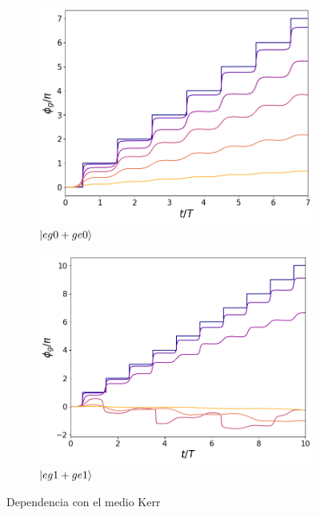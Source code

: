 \begin{figure}[h]
    \centering
    \begin{subfigure}{0.49\textwidth}
        \includegraphics[width=\textwidth]{figuras/ch5/dependencia/eg0+/kerr todo 0.png}
        \caption{$\ket{eg0+ge0}$}
        \label{fig5:dependencia kerr eg0}
    \end{subfigure}
    \hfill
    \begin{subfigure}{0.49\textwidth}
        \includegraphics[width=\textwidth]{figuras/ch5/dependencia/eg1+/kerr todo 0.png}
        \caption{$\ket{eg1+ge1}$}
        \label{fig5:dependencia kerr eg1}
    \end{subfigure}
    \caption{Dependencia con el medio Kerr}
    \label{fig5:dependencia kerr}
\end{figure}

